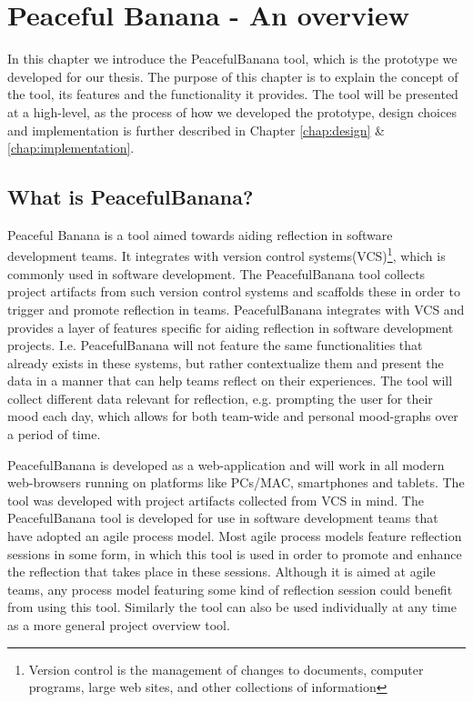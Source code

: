 \chapter{Peaceful Banana - An overview}
\label{peacefulBananaApplication}
In this chapter we introduce the PeacefulBanana tool, which is the prototype we developed for our thesis. The purpose of this chapter is to explain the concept of the tool, its features and the functionality it provides. The tool will be presented at a high-level, as the process of how we developed the prototype, design choices and implementation is further described in Chapter \ref{chap:design} \& \ref{chap:implementation}.
\section{What is PeacefulBanana?}
Peaceful Banana is a tool aimed towards aiding reflection in software development teams. It integrates with version control systems(VCS)\footnote{Version control is the management of changes to documents, computer programs, large web sites, and other collections of information}, which is commonly used in software development. The PeacefulBanana tool collects project artifacts from such version control systems and scaffolds these in order to trigger and promote reflection in teams. PeacefulBanana integrates with VCS and provides a layer of features specific for aiding reflection in software development projects. I.e.  PeacefulBanana will not feature the same functionalities that already exists in these systems, but rather contextualize them and present the data in a manner that can help teams reflect on their experiences. The tool will collect different data relevant for reflection, e.g. prompting the user for their mood each day, which allows for both team-wide and personal mood-graphs over a period of time.

PeacefulBanana is developed as a web-application and will work in all modern web-browsers running on platforms like PCs/MAC, smartphones and tablets.
The tool was developed with project artifacts collected from VCS in mind. The PeacefulBanana tool is developed for use in software development teams that have adopted an agile process model. Most agile process models feature reflection sessions in some form, in which this tool is used in order to promote and enhance the reflection that takes place in these sessions. Although it is aimed at agile teams, any process model featuring some kind of reflection session could benefit from using this tool. Similarly the tool can also be used individually at any time as a more general project overview tool. 

